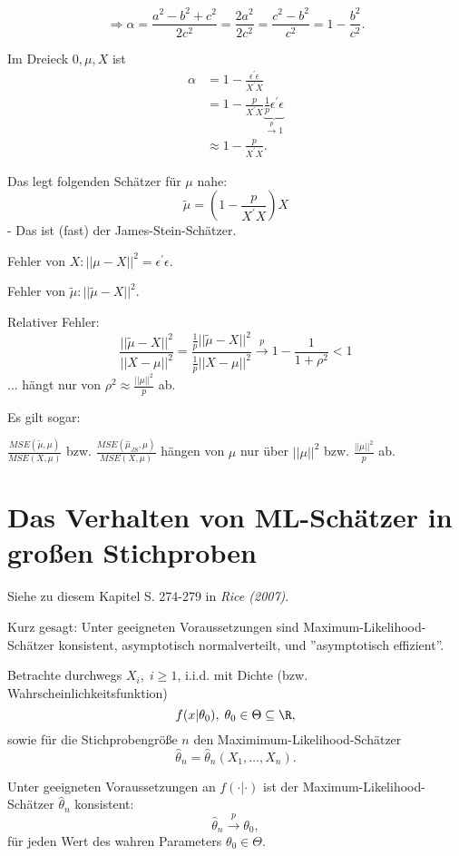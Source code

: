 \documentclass{tstextbook}
\begin{document}
	\[ \Rightarrow \alpha = \frac{a^2-b^2+c^2}{2c^2} = \frac{2a^2}{2c^2} = \frac{c^2-b^2}{c^2} = 1 - \frac{b^2}{c^2} . \] 
	
	Im Dreieck $ 0,\mu,X $ ist 
	\[
	\begin{aligned}
		\alpha & = 1- \frac{\epsilon^\prime\epsilon}{X^\prime X} \\
		& = 1 - \frac{p}{X^\prime X}\underbrace{\frac{1}{p}\epsilon^\prime\epsilon}_{\xrightarrow{p} 1} \\
		& \approx 1- \frac{p}{X^\prime X}.
	\end{aligned}
	\]
	
	Das legt folgenden Schätzer für $ \mu $ nahe:
	\[
	\tilde{\mu} = \left(1-\frac{p}{X^\prime X}\right)X
	\]
	- Das ist (fast) der James-Stein-Schätzer. 
	
	Fehler von $ X\colon ||\mu-X||^2 = \epsilon^\prime \epsilon $. 
	
	Fehler von $ \tilde{\mu}  \colon ||\tilde{\mu} -X||^2 $. 
	
	Relativer Fehler: 
	\[
	\frac{||\tilde{\mu}-X||^2}{||X-\mu||^2} = \frac{\frac{1}{p}||\tilde{\mu}-X||^2}{\frac{1}{p}||X-\mu||^2} \xrightarrow{p} 1-\frac{1}{1+\rho^2} < 1
	\]
	... hängt nur von $ \rho^2  \approx \frac{||\mu||^2}{p} $ ab.
	
	Es gilt sogar:
	
	$ \frac{MSE(\tilde{\mu},\mu)}{MSE(X,\mu)} $ bzw. 	$ \frac{MSE(\hat{\mu}_{JS},\mu)}{MSE(X,\mu)} $ hängen von $ \mu $ nur über $ ||\mu||^2 $ bzw. $ \frac{||\mu||^2}{p} $ ab.
	
	
	\section{Das Verhalten von ML-Schätzer in großen Stichproben}
	
	\begin{book}
		Siehe zu diesem Kapitel S. 274-279 in	\textit{Rice (2007)}.
	\end{book}
	
	Kurz gesagt: Unter geeigneten Voraussetzungen sind Maximum-Likelihood-Schätzer konsistent, asymptotisch normalverteilt, und ''asymptotisch effizient''.
	
	Betrachte durchwegs $ X_i, \; i \ge 1 $, i.i.d. mit Dichte (bzw. Wahrscheinlichkeitsfunktion)
	\[
	f(x|\theta_0), \; \theta_0\in\Theta\subseteq\R,
	\] 
	sowie für die Stichprobengröße $ n $ den Maximimum-Likelihood-Schätzer 
	\[
	\hat{\theta}_n = \hat{\theta}_n\left(X_1,\ldots,X_n\right).
	\]
	
	\begin{satz}[Konsistenz]
		Unter geeigneten Voraussetzungen an $ f(\cdot|\cdot) $ ist der Maximum-Likelihood-Schätzer $ \hat{\theta}_n $ konsistent:
		\[
		\hat{\theta}_n \xrightarrow{p} \theta_0,
		\]
		für jeden Wert des wahren Parameters $ \theta_0\in\Theta $.
	\end{satz}
	
\end{document}
